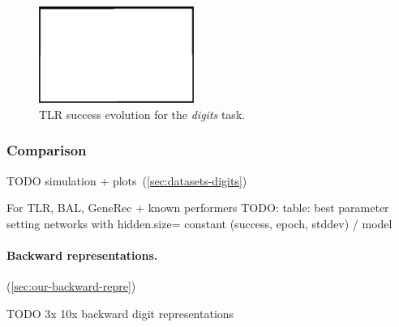 \begin{figure}[H]
  \centering
  \includegraphics[width=0.45\textwidth]{img/placeholder.png}  %
  \caption{TLR success evolution for the \emph{digits} task.}
  \label{fig:results-tlr-digits-epoch} 
\end{figure}

\subsubsection{Comparison} 
\label{sec:results-cmp-digits} 
TODO simulation + plots~(\ref{sec:datasets-digits}) 

For TLR, BAL, GeneRec + known performers 
TODO: table: best parameter setting networks with hidden.size= constant (success, epoch, stddev) / model \\

\paragraph{Backward representations.} 
(\ref{sec:our-backward-repre}) 

TODO 3x 10x backward digit representations 

